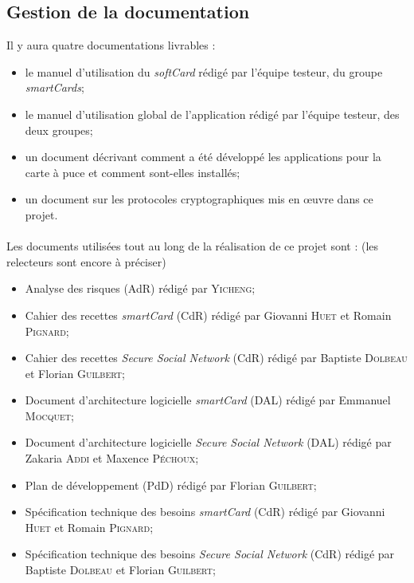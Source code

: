 \documentclass[a4paper,11pt,french]{article}
\begin{document}
\subsection{Gestion de la documentation}
Il y aura quatre documentations livrables : 
\begin{itemize}
 \item le manuel d'utilisation du \emph{softCard} rédigé par l'équipe testeur,
 du groupe \emph{smartCards};
 \item le manuel d'utilisation global de l'application rédigé par l'équipe 
 testeur, des deux groupes;
 \item un document décrivant comment a été développé les applications pour
 la carte à puce et comment sont-elles installés;
 \item un document sur les protocoles cryptographiques mis en \oe{}uvre
 dans ce projet.
\end{itemize}
\paragraph{}
Les documents utilisées tout au long de la réalisation de ce projet sont : 
(les relecteurs sont encore à préciser)
\begin{itemize}
 \item Analyse des risques (AdR) rédigé par \textsc{Yicheng};
 \item Cahier des recettes \emph{smartCard} (CdR) rédigé par Giovanni 
\textsc{Huet} et Romain \textsc{Pignard};
 \item Cahier des recettes \emph{Secure Social Network} (CdR) rédigé par 
 Baptiste \textsc{Dolbeau} et Florian \textsc{Guilbert};
 \item Document d'architecture logicielle \emph{smartCard} (DAL) rédigé par 
 Emmanuel \textsc{Mocquet};
 \item Document d'architecture logicielle \emph{Secure Social Network} (DAL) 
 rédigé par Zakaria \textsc{Addi} et Maxence \textsc{Péchoux};
 \item Plan de développement (PdD) rédigé par Florian \textsc{Guilbert};
 \item Spécification technique des besoins \emph{smartCard} (CdR) rédigé par 
 Giovanni \textsc{Huet} et Romain \textsc{Pignard};
 \item Spécification technique des besoins \emph{Secure Social Network} (CdR) 
    rédigé par Baptiste \textsc{Dolbeau} et Florian \textsc{Guilbert};
\end{itemize}
\end{document}
